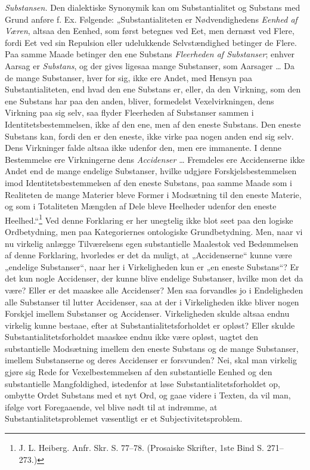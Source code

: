 \documentclass[11pt]{book}
\newcommand{\opage}[1]{\marginnote{\footnotesize\textit{[#1]}}}
\begin{document}
\emph{Substansen.} Den dialektiske Synonymik kan om Substantialitet og
Substans med Grund anføre f. Ex. Følgende: „Substantialiteten er
Nødvendighedens \emph{Eenhed af Væren}, altsaa den Eenhed, som først
betegnes ved Eet, men dernæst ved Flere, fordi Eet ved sin Repulsion eller
udelukkende Selvstændighed betinger de Flere. Paa samme Maade betinger den
ene Substans \emph{Fleerheden af Substanser}; enhver Aarsag er
\emph{Substans}, og der gives ligesaa mange Substanser, som Aarsager \ldots{}
Da de mange Substanser, hver for sig, ikke ere Andet, med Hensyn paa
Substantialiteten, end hvad den ene Substans er, eller, da den Virkning,
som den ene Substans har paa den anden, bliver, formedelst
Vexelvirkningen, dens Virkning paa sig selv, saa flyder Fleerheden af
Substanser sammen i Identitetsbestemmelsen, ikke af den ene, men af den
eneste Substans. Den eneste Substans kan, fordi den er den eneste, ikke
virke paa nogen anden end sig selv. Dens Virkninger falde altsaa ikke
udenfor den, men ere immanente. I denne Bestemmelse ere Virkningerne dens
\emph{Accidenser} \ldots{} Fremdeles ere Accidenserne ikke Andet end de
mange endelige Substanser, hvilke udgjøre Forskjelsbestemmelsen imod
Identitetsbestemmelsen af den eneste Substans, paa samme Maade som i
Realiteten de mange Materier bleve Former i Modsætning til den eneste
Materie, og som i Totaliteten Mængden af Dele bleve Heelheder udenfor den
eneste Heelhed.“\footnote{J. L. Heiberg. Anfr. Skr. S. 77--78. (Prosaiske
Skrifter, 1ste Bind S. 271--273.)}
Ved denne Forklaring er her unegtelig ikke blot seet paa den logiske
Ordbetydning, men paa Kategoriernes ontologiske Grundbetydning. Men, naar
vi nu virkelig anlægge Tilværelsens egen substantielle Maalestok ved
Bedømmelsen af denne Forklaring, hvorledes er det da muligt, at
\opage{137} \setcounter{footnote}{0}%
„Accidenserne“ kunne være „endelige Substanser“, naar her i Virkeligheden
kun er „en eneste Substans“? Er det kun nogle Accidenser, der kunne blive
endelige Substanser, hvilke mon det da være? Eller er det maaskee alle
Accidenser? Men saa forvandles jo i Endeligheden alle Substanser til
lutter Accidenser, saa at der i Virkeligheden ikke bliver nogen Forskjel
imellem Substanser og Accidenser. Virkeligheden skulde altsaa endnu
virkelig kunne bestaae, efter at Substantialitetsforholdet er opløst?
Eller skulde Substantialitetsforholdet maaskee endnu ikke være opløst,
uagtet den substantielle Modsætning imellem den eneste Substans og de
mange Substanser, imellem Substanserne og deres Accidenser er forsvunden?
Nei, skal man virkelig gjøre sig Rede for Vexelbestemmelsen af den
substantielle Eenhed og den substantielle Mangfoldighed, istedenfor at
løse Substantialitetsforholdet op, ombytte Ordet Substans med et nyt Ord,
og gaae videre i Texten, da vil man, ifølge vort Foregaaende, vel blive
nødt til at indrømme, at Substantialitetsproblemet væsentligt er et
Subjectivitetsproblem.
\end{document}
